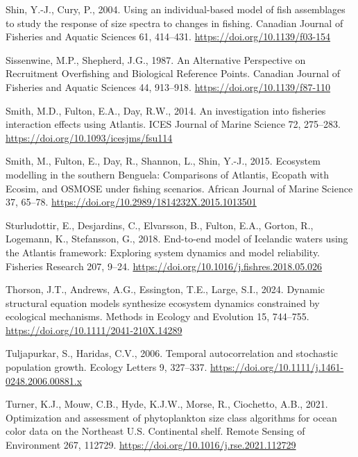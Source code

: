 \documentclass[
]{article}
\newlength{\cslhangindent}
\newenvironment{CSLReferences}[2] %
 {\begin{list}{}{%
  \setlength{\itemindent}{0pt}
  \setlength{\leftmargin}{0pt}
  \setlength{\parsep}{0pt}
  \ifodd #1
   \setlength{\leftmargin}{\cslhangindent}
   \setlength{\itemindent}{-1\cslhangindent}
  \fi
  \setlength{\itemsep}{#2\baselineskip}}}
 {\end{list}}
\begin{document}
\begin{CSLReferences}{1}{0}
Shin, Y.-J., Cury, P., 2004. Using an individual-based model of fish assemblages to study the response of size spectra to changes in fishing. Canadian Journal of Fisheries and Aquatic Sciences 61, 414--431. \url{https://doi.org/10.1139/f03-154}

Sissenwine, M.P., Shepherd, J.G., 1987. An {Alternative Perspective} on {Recruitment Overfishing} and {Biological Reference Points}. Canadian Journal of Fisheries and Aquatic Sciences 44, 913--918. \url{https://doi.org/10.1139/f87-110}

Smith, M.D., Fulton, E.A., Day, R.W., 2014. An investigation into fisheries interaction effects using {Atlantis}. ICES Journal of Marine Science 72, 275--283. \url{https://doi.org/10.1093/icesjms/fsu114}

Smith, M., Fulton, E., Day, R., Shannon, L., Shin, Y.-J., 2015. Ecosystem modelling in the southern {Benguela}: Comparisons of {Atlantis}, {Ecopath} with {Ecosim}, and {OSMOSE} under fishing scenarios. African Journal of Marine Science 37, 65--78. \url{https://doi.org/10.2989/1814232X.2015.1013501}

Sturludottir, E., Desjardins, C., Elvarsson, B., Fulton, E.A., Gorton, R., Logemann, K., Stefansson, G., 2018. End-to-end model of {Icelandic} waters using the {Atlantis} framework: {Exploring} system dynamics and model reliability. Fisheries Research 207, 9--24. \url{https://doi.org/10.1016/j.fishres.2018.05.026}

Thorson, J.T., Andrews, A.G., Essington, T.E., Large, S.I., 2024. Dynamic structural equation models synthesize ecosystem dynamics constrained by ecological mechanisms. Methods in Ecology and Evolution 15, 744--755. \url{https://doi.org/10.1111/2041-210X.14289}

Tuljapurkar, S., Haridas, C.V., 2006. Temporal autocorrelation and stochastic population growth. Ecology Letters 9, 327--337. \url{https://doi.org/10.1111/j.1461-0248.2006.00881.x}

Turner, K.J., Mouw, C.B., Hyde, K.J.W., Morse, R., Ciochetto, A.B., 2021. Optimization and assessment of phytoplankton size class algorithms for ocean color data on the {Northeast U}.{S}. Continental shelf. Remote Sensing of Environment 267, 112729. \url{https://doi.org/10.1016/j.rse.2021.112729}

\end{CSLReferences}
\end{document}

